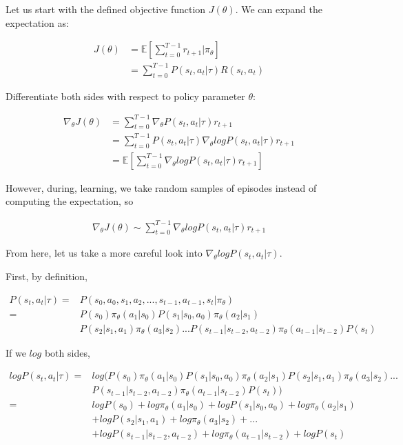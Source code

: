 \documentclass[letterpaper,11pt]{article}
\begin{document}
Let us start with the defined objective function $J(\theta)$. We can expand the expectation as:

$$
\begin{aligned}
J(\theta) &= \mathbb{E}[\sum\limits_{t=0}^{T-1} r_{t+1} | \pi_{\theta}] \\ &= \sum\limits_{t=0}^{T-1}P(s_{t}, a_{t} | \tau) R(s_{t}, a_{t}) 
\end{aligned}
$$

Differentiate both sides with respect to policy parameter $\theta$:

$$
\begin{aligned}
    \nabla_{\theta} J(\theta) & = \sum\limits_{t=0}^{T-1} \nabla_{\theta} P(s_{t}, a_{t} | \tau) r_{t+1} \\ & = \sum\limits_{t=0}^{T-1} P(s_{t}, a_{t} | \tau) \nabla_{\theta} log P(s_{t}, a_{t} | \tau) r_{t+1} \\ & = \mathbb{E} [\sum\limits_{t=0}^{T-1} \nabla_{\theta} log P(s_{t}, a_{t} | \tau) r_{t+1}]
\end{aligned}
$$

However, during, learning, we take random samples of episodes instead of computing the expectation, so

$$
\begin{aligned}
    \nabla_{\theta} J(\theta) \sim \sum\limits_{t=0}^{T-1} \nabla_{\theta} log P(s_{t}, a_{t} | \tau) r_{t+1}
\end{aligned}
$$

From here, let us take a more careful look into $\nabla_{\theta} log P(s_{t}, a_{t} | \tau) $.

First, by definition,

$$
\begin{aligned}
    P(s_{t}, a_{t} | \tau) ={}& P(s_{0}, a_{0}, s_{1}, a_{2}, ..., s_{t-1}, a_{t-1}, s_{t} | \pi_{\theta}) \\
                           ={}& P(s_{0}) \pi_{\theta}(a_{1} | s_{0}) P(s_{1} | s_{0}, a_{0}) \pi_{\theta}(a_{2} | s_{1}) \\
& P(s_{2} | s_{1}, a_{1}) \pi_{\theta}(a_{3} | s_{2}) ... P(s_{t-1} | s_{t-2}, a_{t-2}) \pi_{\theta}(a_{t-1} | s_{t-2}) P(s_{t}) 
\end{aligned}
$$

If we $log$ both sides,

$$
\begin{aligned}
    log P(s_{t}, a_{t} | \tau)  ={}& log (P(s_{0}) \pi_{\theta}(a_{1} | s_{0}) P(s_{1} | s_{0}, a_{0}) \pi_{\theta}(a_{2} | s_{1}) P(s_{2} | s_{1}, a_{1}) \pi_{\theta}(a_{3} | s_{2}) ... \\
& P(s_{t-1} | s_{t-2}, a_{t-2}) \pi_{\theta}(a_{t-1} | s_{t-2}) P(s_{t})) \\ ={}& log P(s_{0}) + log \pi_{\theta}(a_{1} | s_{0}) + log P(s_{1} | s_{0}, a_{0}) + log \pi_{\theta}(a_{2} | s_{1})\\
& + log P(s_{2} | s_{1}, a_{1}) + log \pi_{\theta}(a_{3} | s_{2}) + ... \\
& + log P(s_{t-1} | s_{t-2}, a_{t-2}) + log \pi_{\theta}(a_{t-1} | s_{t-2}) + log P(s_{t})
\end{aligned}
$$
\end{document}
